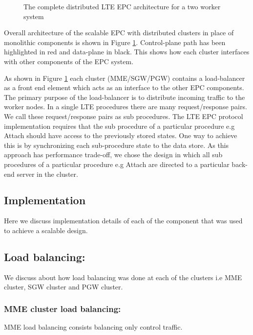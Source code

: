 \documentclass[hidelinks]{report}
\begin{document}
\begin{center}
\begin{figure}[H]
\centering
{}
\caption{The complete distributed LTE EPC architecture for a two worker system}
\label{fig:overall}
\end{figure}
\end{center}
Overall architecture of the scalable EPC with distributed clusters in place of monolithic components is shown in Figure \ref{fig:overall}. Control-plane path has been highlighted in red and data-plane in black. This shows how each cluster interfaces with other components of the EPC system.

As shown in Figure \ref{fig:overall} each cluster (MME/SGW/PGW) contains a load-balancer as a front end element which acts as an interface to the other EPC components. The primary purpose of the load-balancer is to distribute incoming traffic to the worker nodes. In a single LTE procedures there are many request/response pairs. We call these request/response pairs as sub procedures. The LTE EPC protocol implementation requires that the sub procedure of a particular procedure e.g Attach should have access to the previously stored states. One way to achieve this is by synchronizing each sub-procedure state to the data store. As this approach has performance trade-off, we chose the design in which all sub procedures of a particular procedure e.g Attach are directed to a particular back-end server in the cluster. 

\begin{center}
\subsection*{Implementation}

\end{center}
Here we discuss implementation details of each of the component that was used to achieve a scalable design.
\subsection*{Load balancing:}
\label{lb}
We discuss about how load balancing was done at each of the clusters i.e MME cluster, SGW cluster and PGW cluster.

\subsubsection{\textbf{MME cluster load balancing:}}
MME load balancing consists balancing only control traffic.
\end{document}
